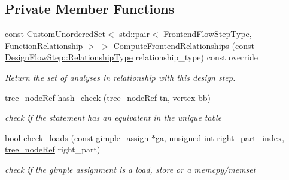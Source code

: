 \subsection*{Private Member Functions}
\begin{DoxyCompactItemize}
\item 
const \hyperlink{classCustomUnorderedSet}{Custom\+Unordered\+Set}$<$ std\+::pair$<$ \hyperlink{frontend__flow__step_8hpp_afeb3716c693d2b2e4ed3e6d04c3b63bb}{Frontend\+Flow\+Step\+Type}, \hyperlink{classFrontendFlowStep_af7cf30f2023e5b99e637dc2058289ab0}{Function\+Relationship} $>$ $>$ \hyperlink{classCSE_a0a111aeea50dcdf012272ad684136558}{Compute\+Frontend\+Relationships} (const \hyperlink{classDesignFlowStep_a723a3baf19ff2ceb77bc13e099d0b1b7}{Design\+Flow\+Step\+::\+Relationship\+Type} relationship\+\_\+type) const override
\begin{DoxyCompactList}\small\item\em Return the set of analyses in relationship with this design step. \end{DoxyCompactList}\item 
\hyperlink{tree__node_8hpp_a6ee377554d1c4871ad66a337eaa67fd5}{tree\+\_\+node\+Ref} \hyperlink{classCSE_a0b52dafe140cbca69eadfa11169bfbba}{hash\+\_\+check} (\hyperlink{tree__node_8hpp_a6ee377554d1c4871ad66a337eaa67fd5}{tree\+\_\+node\+Ref} tn, \hyperlink{graph_8hpp_abefdcf0544e601805af44eca032cca14}{vertex} bb)
\begin{DoxyCompactList}\small\item\em check if the statement has an equivalent in the unique table \end{DoxyCompactList}\item 
bool \hyperlink{classCSE_ac4ffe21033c163f44c7117e78da4d50e}{check\+\_\+loads} (const \hyperlink{structgimple__assign}{gimple\+\_\+assign} $\ast$ga, unsigned int right\+\_\+part\+\_\+index, \hyperlink{tree__node_8hpp_a6ee377554d1c4871ad66a337eaa67fd5}{tree\+\_\+node\+Ref} right\+\_\+part)
\begin{DoxyCompactList}\small\item\em check if the gimple assignment is a load, store or a memcpy/memset \end{DoxyCompactList}\end{DoxyCompactItemize}
